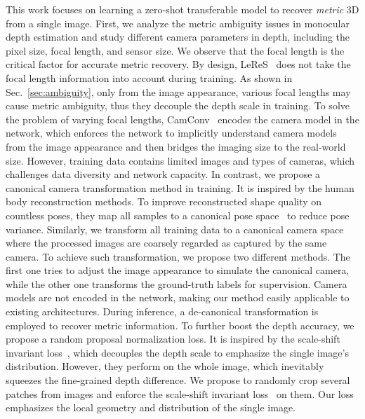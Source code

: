 This work focuses on learning a zero-shot transferable model to recover \textit{metric} 3D from a single image.
First, we  analyze the metric ambiguity issues in monocular depth estimation and study different camera parameters in depth, including the pixel size, focal length, and sensor size. We observe that 
the focal length is the critical factor for accurate metric recovery. %
By design, LeReS~\cite{leres} 
does not take the focal length information into account during training. As shown in Sec.~\ref{sec:ambiguity}, only from the image appearance, various focal lengths may cause metric ambiguity, thus they decouple the depth scale in training.
To solve the problem of varying focal lengths, CamConv~\cite{facil2019cam}  encodes the camera model in the network, which enforces the network to implicitly understand camera models from
the image appearance and then bridges the imaging size to
the real-world size. However, training data contains limited images and types of cameras, %
which challenges data diversity and network capacity.
In contrast, we propose a canonical camera transformation method in training. It is inspired by the human body reconstruction methods. To improve reconstructed shape quality on countless poses, they map all samples to a canonical pose space~\cite{peng2022animatable} to reduce pose variance. Similarly, 
we transform all training data to a canonical camera space where the processed images are coarsely regarded as captured by the same camera.
To achieve such transformation, we propose two different methods. The first one tries to adjust the image appearance to simulate the canonical camera, while the other one transforms the ground-truth labels for supervision. Camera models are not encoded in the network, making our method easily applicable to existing architectures. During inference, a de-canonical transformation is employed to recover metric information. 
To further boost the depth accuracy, we propose a random proposal normalization loss. It is inspired by the scale-shift invariant loss~\cite{leres, Ranftl2020,zhang2022hierarchical}, which decouples the depth scale to emphasize the single image's distribution. However, they perform on the whole image, which inevitably squeezes the fine-grained depth difference. We propose to randomly crop several patches from images and enforce the scale-shift invariant loss~\cite{leres, Ranftl2020} on them. Our loss emphasizes the local geometry and distribution of the single image. 

